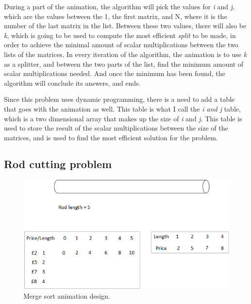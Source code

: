 During a part of the animation, the algorithm will pick the values for \textit{i} and \textit{j}, which are the values between the 1, the first matrix, and N, where it is the number of the last matrix in the list. Between these two values, there will also be \textit{k}, which is going to be used to compute the most efficient \textit{split} to be made, in order to achieve the minimal amount of scalar multiplications between the two lists of the matrices. In every iteration of the algorithm, the animation is to use \textit{k} as a splitter, and between the two parts of the list, find the minimum amount of scalar multiplications needed. And once the minimum has been found, the algorithm will conclude its answers, and ends.

Since this problem uses dynamic programming, there is a need to add a table that goes with the animation as well. This table is what I call the \textit{i and j} table, which is a two dimensional array that makes up the size of \textit{i} and \textit{j}. This table is used to store the result of the scalar multiplications between the size of the matrices, and is used to find the most efficient solution for the problem. 

%

\subsection{Rod cutting problem}

\begin{figure}[H]
\centering
\includegraphics[scale=0.9]{images/report_images/animationDesignRodCuttingProblem.png}
\caption{Merge sort animation design.}
\label{animationDesignRodCuttingProblem}
\end{figure}

